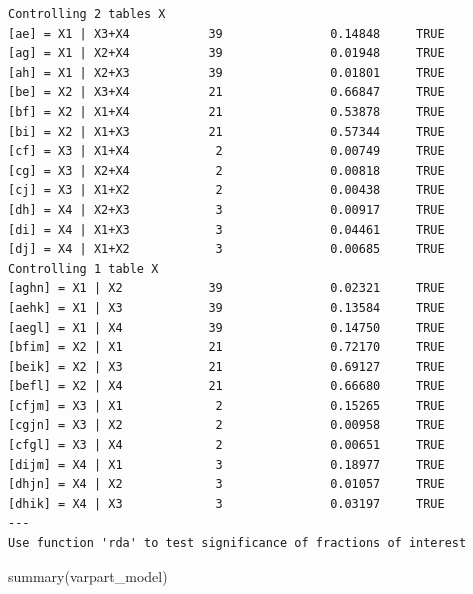 \documentclass[
  letterpaper,
  DIV=11,
  numbers=noendperiod]{scrartcl}
\newenvironment{Shaded}{\begin{snugshade}}{\end{snugshade}}
\newcommand{\FunctionTok}[1]{\textcolor[rgb]{0.28,0.35,0.67}{#1}}
\newcommand{\NormalTok}[1]{\textcolor[rgb]{0.00,0.23,0.31}{#1}}
\begin{document}
\begin{verbatim}
Controlling 2 tables X                                       
[ae] = X1 | X3+X4           39               0.14848     TRUE
[ag] = X1 | X2+X4           39               0.01948     TRUE
[ah] = X1 | X2+X3           39               0.01801     TRUE
[be] = X2 | X3+X4           21               0.66847     TRUE
[bf] = X2 | X1+X4           21               0.53878     TRUE
[bi] = X2 | X1+X3           21               0.57344     TRUE
[cf] = X3 | X1+X4            2               0.00749     TRUE
[cg] = X3 | X2+X4            2               0.00818     TRUE
[cj] = X3 | X1+X2            2               0.00438     TRUE
[dh] = X4 | X2+X3            3               0.00917     TRUE
[di] = X4 | X1+X3            3               0.04461     TRUE
[dj] = X4 | X1+X2            3               0.00685     TRUE
Controlling 1 table X                                        
[aghn] = X1 | X2            39               0.02321     TRUE
[aehk] = X1 | X3            39               0.13584     TRUE
[aegl] = X1 | X4            39               0.14750     TRUE
[bfim] = X2 | X1            21               0.72170     TRUE
[beik] = X2 | X3            21               0.69127     TRUE
[befl] = X2 | X4            21               0.66680     TRUE
[cfjm] = X3 | X1             2               0.15265     TRUE
[cgjn] = X3 | X2             2               0.00958     TRUE
[cfgl] = X3 | X4             2               0.00651     TRUE
[dijm] = X4 | X1             3               0.18977     TRUE
[dhjn] = X4 | X2             3               0.01057     TRUE
[dhik] = X4 | X3             3               0.03197     TRUE
---
Use function 'rda' to test significance of fractions of interest
\end{verbatim}

\begin{Shaded}
\begin{Highlighting}[]
\FunctionTok{summary}\NormalTok{(varpart\_model)}
\end{Highlighting}
\end{Shaded}
\end{document}
